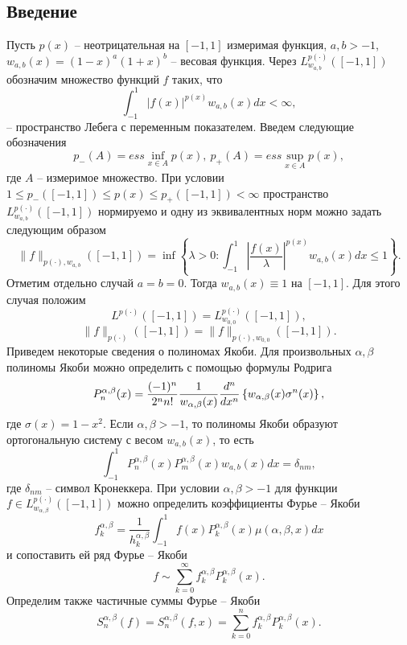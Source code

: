 \subsection{Введение}
Пусть $p(x)$ -- неотрицательная на $[-1,1]$ измеримая функция, $a,b>-1$, $w_{a,b}(x)=(1-x)^a(1+x)^b$ -- весовая функция. Через $L^{p(\cdot)}_{w_{a,b}}([-1,1])$ обозначим множество функций $f$ таких, что
\begin{equation}\label{s2-lpx-def-1}
  \int_{-1}^1|f(x)|^{p(x)}w_{a,b}(x)dx<\infty,
\end{equation}
-- пространство Лебега с переменным показателем. Введем следующие обозначения
$$p_-(A)=ess\inf_{x\in A}p(x),\ p_+(A)=ess\sup_{x\in A}p(x),$$
где $A$ -- измеримое множество.
 При условии $1\le p_-([-1,1])\le p(x)\le p_+([-1,1])<\infty$ пространство $L^{p(\cdot)}_{w_{a,b}}([-1,1])$ нормируемо \cite{tad-lpxtopology} и одну из эквивалентных норм можно задать следующим образом
\begin{equation}\label{s2-lpx-norm}
  \|f\|_{p(\cdot),w_{a,b}}([-1,1])=\inf\left\{\lambda>0:\int_{-1}^1\left|\frac{f(x)}\lambda\right|^{p(x)}w_{a,b}(x)dx\le1\right\}.
\end{equation}
Отметим отдельно случай $a=b=0$. Тогда $w_{a,b}(x)\equiv1$ на $[-1,1]$. Для этого случая положим $$L^{p(\cdot)}([-1,1])=L^{p(\cdot)}_{w_{0,0}}([-1,1]),$$
$$\|f\|_{p(\cdot)}([-1,1])=\|f\|_{p(\cdot),w_{0,0}}([-1,1]).$$
Приведем некоторые сведения о полиномах Якоби. Для произвольных $\alpha,\beta$ полиномы Якоби можно определить с помощью формулы Родрига
\begin{equation}\label{RodrigueFormula}
  P_n^{\alpha,\beta}(x) = {(-1)^n\over2^nn!}{1\over w_{\alpha,\beta}(x)}{d^n\over
dx^n} \left\{w_{\alpha,\beta}(x)\sigma^n(x)\right\},
\end{equation}
где $\sigma(x)=1-x^2$. Если $\alpha,\beta>-1$, то полиномы Якоби образуют ортогональную систему с весом  $w_{a,b}(x)$, то есть
\begin{equation}\label{JacobiOrthognality}
	\int_{-1}^1P_n^{\alpha,\beta}(x)P_m^{\alpha,\beta}(x)w_{a,b}(x)dx=\delta_{nm},
\end{equation}
где $\delta_{nm}$ -- символ Кронеккера.
При условии $\alpha,\beta>-1$ для функции $f\in L^{p(\cdot)}_{w_{\alpha,\beta}}([-1,1])$ можно определить коэффициенты Фурье -- Якоби
$$
f_k^{\alpha,\beta}=\frac{1}{h_k^{\alpha,\beta}}\int_{-1}^1f(x)P_k^{\alpha,\beta}(x)
\mu(\alpha,\beta,x)dx
$$
и сопоставить ей ряд Фурье -- Якоби
$$
f\sim \sum_{k=0}^\infty f_k^{\alpha,\beta}P_k^{\alpha,\beta}(x).
$$
Определим также частичные суммы Фурье -- Якоби
$$
S_n^{\alpha,\beta}(f)=S_n^{\alpha,\beta}(f,x)=\sum_{k=0}^nf_k^{\alpha,\beta}P_k^{\alpha,\beta}(x).
$$

